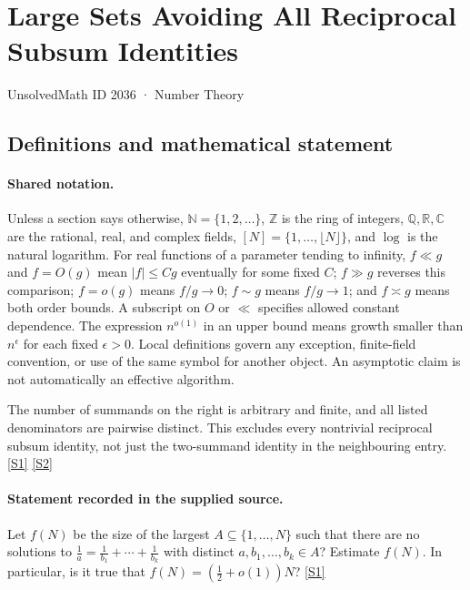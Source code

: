 \documentclass[11pt,a4paper]{article}
\newcommand{\N}{\mathbb{N}}
\newcommand{\Z}{\mathbb{Z}}
\newcommand{\Q}{\mathbb{Q}}
\newcommand{\R}{\mathbb{R}}
\newcommand{\C}{\mathbb{C}}
\newcommand{\sref}[2]{\hyperlink{source:#1:#2}{[S#2]}}
\begin{document}

\setcounter{section}{2035}

\section{Large Sets Avoiding All Reciprocal Subsum Identities}\label{2036}

{\small\sffamily UnsolvedMath ID 2036 · Number Theory}

\subsection{Definitions and mathematical statement}

\paragraph{Shared notation.}Unless a section says otherwise, $\N=\{1,2,\ldots\}$,
$\Z$ is the ring of integers, $\Q,\R,\C$ are the rational, real, and complex
fields, $[N]=\{1,\ldots,\lfloor N\rfloor\}$, and $\log$ is the natural
logarithm. For real functions of a parameter tending to infinity,
$f\ll g$ and $f=O(g)$ mean $|f|\leq Cg$ eventually for some fixed $C$;
$f\gg g$ reverses this comparison; $f=o(g)$ means $f/g\to0$;
$f\sim g$ means $f/g\to1$; and $f\asymp g$ means both order bounds.
A subscript on $O$ or $\ll$ specifies allowed constant dependence.
The expression $n^{o(1)}$ in an upper bound means growth smaller than
$n^\epsilon$ for each fixed $\epsilon>0$. Local definitions govern any
exception, finite-field convention, or use of the same symbol for another
object. An asymptotic claim is not automatically an effective algorithm.



The number of summands on the right is arbitrary and finite, and all listed denominators are pairwise distinct. This excludes every nontrivial reciprocal subsum identity, not just the two-summand identity in the neighbouring entry. \sref{2036}{1} \sref{2036}{2}

\paragraph{Statement recorded in the supplied source.}
Let $f(N)$ be the size of the largest $A\subseteq \{1,\ldots,N\}$ such that there are no solutions to $ \frac{1}{a}= \frac{1}{b_1}+\cdots+\frac{1}{b_k} $ with distinct $a,b_1,\ldots,b_k\in A$?
Estimate $f(N)$. In particular, is it true that $f(N)=(\tfrac{1}{2}+o(1))N$? \sref{2036}{1}
\end{document}
